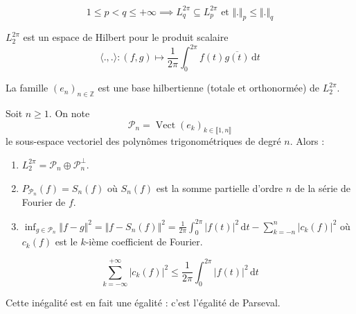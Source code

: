   \begin{remark}
    \[ 1 \leq p < q \leq +\infty \implies L_q^{2\pi} \subseteq L_p^{2\pi} \text{ et } \Vert . \Vert_p \leq \Vert . \Vert_q \]
  \end{remark}

  \begin{proposition}
    $L_2^{2\pi}$ est un espace de Hilbert pour le produit scalaire
    \[ \langle ., . \rangle : (f, g) \mapsto \frac{1}{2 \pi} \int_0^{2\pi} f(t) \overline{g(t)} \, \mathrm{d}t \]
  \end{proposition}


  \begin{theorem}
    La famille $(e_n)_{n \in \mathbb{Z}}$ est une base hilbertienne (totale et orthonormée) de $L_2^{2 \pi}$.
  \end{theorem}


  \begin{corollary}
    Soit $n \geq 1$. On note \[ \mathcal{P}_n = \operatorname{Vect}(e_k)_{k \in \llbracket 1, n \rrbracket} \]
    le sous-espace vectoriel des polynômes trigonométriques de degré $n$. Alors :
    \begin{enumerate}[label=(\roman*)]
      \item $L_2^{2\pi} = \mathcal{P}_n \oplus \mathcal{P}_n^\perp$.
      \item $P_{\mathcal{P}_n}(f) = S_n(f)$
      où $S_n(f)$ est la somme partielle d'ordre $n$ de la série de Fourier de $f$.
      \item $\inf_{g \in \mathcal{P}_n} \Vert f-g \Vert^2 = \Vert f-S_n(f) \Vert^2 = \frac{1}{2\pi} \int_0^{2\pi} \vert f(t) \vert^2 \, \mathrm{d}t - \sum_{k=-n}^{n} \vert c_k(f) \vert^2$
      où $c_k(f)$ est le $k$-ième coefficient de Fourier.
    \end{enumerate}
  \end{corollary}

  \begin{application}
    \[ \sum_{k=-\infty}^{+\infty} \vert c_k(f) \vert^2 \leq \frac{1}{2\pi} \int_0^{2\pi} \vert f(t) \vert^2 \, \mathrm{d}t \]
  \end{application}

  \begin{remark}
    Cette inégalité est en fait une égalité : c'est l'égalité de Parseval.
  \end{remark}

